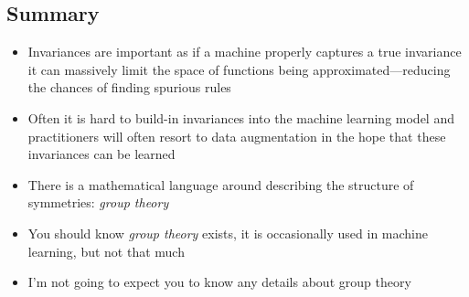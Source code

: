 \begin{slide}
\section[-2]{Summary}

\begin{PauseHighLight}
  \begin{itemize}
  \item Invariances are important as if a machine properly captures a
    true invariance it can massively limit the space of functions
    being approximated\pause---reducing the chances of finding
    spurious rules\pauseb
  \item Often it is hard to build-in invariances into the machine
    learning model and practitioners will often resort to data
    augmentation in the hope that these invariances can be
    learned\pause
  \item There is a mathematical language around describing the
    structure of symmetries: \emph{group theory}\pause
  \item You should know \textit{group theory} exists, it is occasionally used in machine
    learning, but not that much\pause
  \item I'm not going to expect you to know any details about group
    theory\pauseb
  \end{itemize}
\end{PauseHighLight}

\end{slide}



